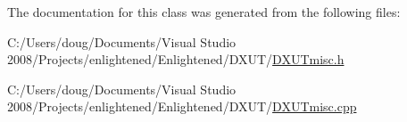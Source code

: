 The documentation for this class was generated from the following files:\begin{DoxyCompactItemize}
\item 
C:/Users/doug/Documents/Visual Studio 2008/Projects/enlightened/Enlightened/DXUT/\hyperlink{_d_x_u_tmisc_8h}{DXUTmisc.h}\item 
C:/Users/doug/Documents/Visual Studio 2008/Projects/enlightened/Enlightened/DXUT/\hyperlink{_d_x_u_tmisc_8cpp}{DXUTmisc.cpp}\end{DoxyCompactItemize}
